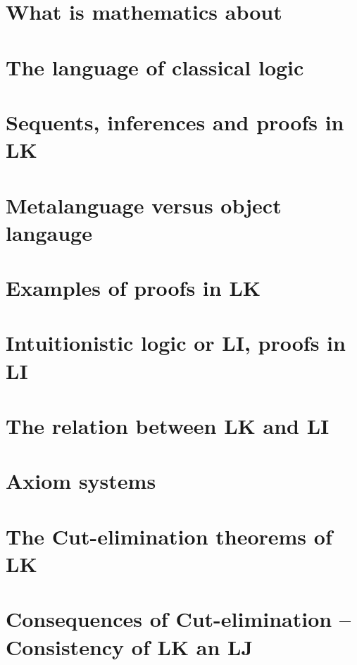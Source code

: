 \documentclass[11pt,a4paper]{article}
\begin{document}

\tableofcontents
\pagebreak
{}


\section{What is mathematics about}

\section{The language of classical logic}

\section{Sequents, inferences and proofs in LK}

\section{Metalanguage versus object langauge}

\section{Examples of proofs in LK}

\section{Intuitionistic logic or LI, proofs in LI}

\section{The relation between LK and LI}

\section{Axiom systems}

\section{The Cut-elimination theorems of LK}

\section{Consequences of Cut-elimination -- Consistency of LK an LJ}
\end{document}
